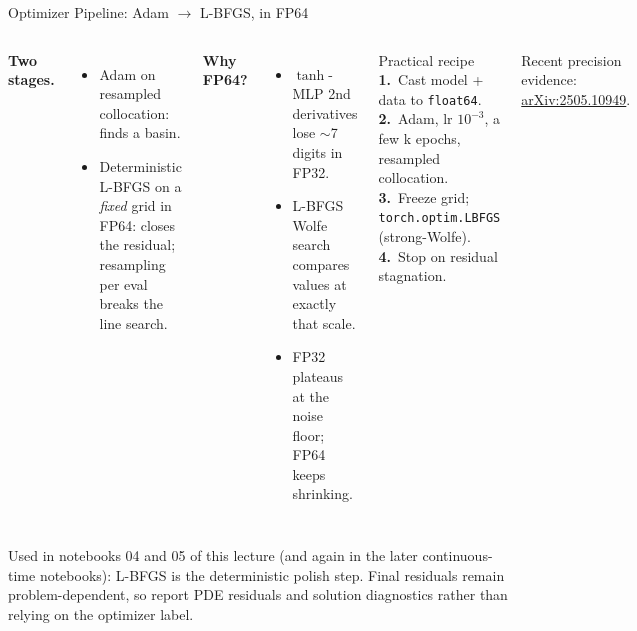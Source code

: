 \documentclass[aspectratio=169,11pt]{beamer}
\newcommand{\emphc}[1]{\textcolor{harvardcrimson}{#1}}
\begin{document}
\begin{frame}[shrink=8]{Optimizer Pipeline: Adam $\to$ L-BFGS, in FP64}
\small
\begin{columns}[T]
\textbf{Two stages.}
\begin{itemize}\itemsep0pt
    \item \emphc{Adam} on resampled collocation: finds a basin.
    \item \emphc{Deterministic L-BFGS} on a \emph{fixed} grid in FP64: closes the residual; resampling per eval breaks the line search.
\end{itemize}

\vspace{0.3em}
\textbf{Why FP64?}
\begin{itemize}\itemsep0pt
    \item $\tanh$-MLP 2nd derivatives lose $\sim$7 digits in FP32.
    \item L-BFGS Wolfe search compares values at exactly that scale.
    \item FP32 plateaus at the noise floor; FP64 keeps shrinking.
\end{itemize}

\begin{block}{Practical recipe}
\footnotesize
\textbf{1.}~Cast model + data to \texttt{float64}.\\
\textbf{2.}~Adam, lr $10^{-3}$, a few k epochs, resampled collocation.\\
\textbf{3.}~Freeze grid; \texttt{torch.optim.LBFGS} (strong-Wolfe).\\
\textbf{4.}~Stop on residual stagnation.
\end{block}
{\footnotesize Recent precision evidence: \href{https://arxiv.org/abs/2505.10949}{arXiv:2505.10949}.}
\end{columns}

\vspace{0.2em}
{\footnotesize \emphc{Used in notebooks 04 and 05} of this lecture (and again in the later continuous-time notebooks): L-BFGS is the deterministic polish step.  Final residuals remain problem-dependent, so report PDE residuals and solution diagnostics rather than relying on the optimizer label.}
\end{frame}
\end{document}
